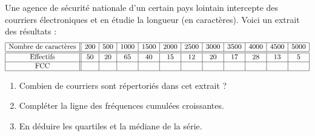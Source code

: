 
\begin{exercice}\label{exosmath-0575}

    Une agence de sécurité nationale d'un certain pays lointain intercepte des courriers électroniques et en étudie la longueur (en caractères). Voici un extrait des résultats :
    \begin{equation*}
        \begin{array}[]{|c||c|c|c|c|c|c|c|c|c|c|c|}
            \hline
            \text{Nombre de caractères}&200&500&1000&1500&2000&2500&3000&3500&4000&4500&5000\\
            \hline\hline
            \text{Effectifs}&50&20&65&40&15&12&20&17&28&13&5\\
            \hline
            \text{FCC}&&&&&&&&&&&\\
            \hline
        \end{array}
    \end{equation*}
    \begin{enumerate}
        \item
            Combien de courriers sont répertoriés dans cet extrait ?
        \item
            Compléter la ligne des fréquences cumulées croissantes.
        \item
            En déduire les quartiles et la médiane de la série.
    \end{enumerate}


\end{exercice}
